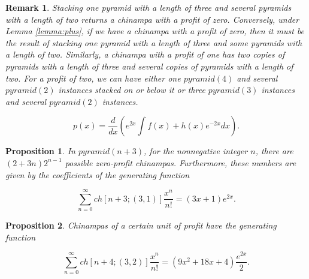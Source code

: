 \documentclass[10pt,a4paper]{amsart}
\newtheorem{remark}{Remark}
\newtheorem{proposition}{Proposition}
\newcommand{\apyr}[1][l]{\ensuremath{pyramid(#1)}}
\newcommand{\chin}[2][n]{\ensuremath{ch[#1;#2]}}
\begin{document}
\begin{remark}\label{rmk:prof-0-1}
Stacking one pyramid with a length of three and several pyramids with a length of two returns a chinampa with a profit of zero. Conversely, under Lemma \ref{lemma:plus}, if we have a chinampa with a profit of zero, then it must be the result of stacking one pyramid with a length of three and some pyramids with a length of two. Similarly, a chinampa with a profit of one has  two copies of pyramids with a length of three and several copies of pyramids with a length of two. For a profit of two,  we can have either one $\apyr[4]$ and several $\apyr[2]$ instances stacked on or below it or three  $\apyr[3]$ instances and several $\apyr[2]$ instances.
\end{remark}

\begin{equation}
p(x)= \frac{d}{dx} \left(e^{2x}\int f(x) +h(x)e^{-2x} dx\right)\label{eq:sol}.
\end{equation}

\begin{proposition}
\label{lemma:zero} In $\apyr[n+3]$, for the nonnegative integer $n$, there are $(2+3n) 2^{n-1}$ possible zero-profit chinampas. Furthermore, these numbers are given by the coefficients of the generating function


\begin{equation*}
\sum_{n=0}^\infty \chin[n+3]{(3,1)}\frac{x^n}{n!}=(3x+1)e^{2x}.    
\end{equation*}
\end{proposition}

\begin{proposition}\label{lemma:one}
Chinampas of a certain unit of profit have the generating function

\begin{equation*}
\sum_{n=0}^{\infty} \chin[n+4]{ (3,2)}\frac{x^n}{n!}=(9x^2+18x+4)\frac{e^{2x}}{2}.
\end{equation*}
\end{proposition}
\end{document}
